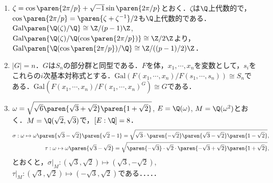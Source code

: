 \documentclass[a4paper,10pt]{ltjsarticle}
\newcommand{\gal}{\mathrm{Gal}}
\begin{document}
\begin{enumerate}
  \item \label{enshu:2.9} $\zeta = \cos\paren{2\pi/p} +\sqrt{-1}\sin\paren{2\pi/p}$とおく．$\zeta$は$\Q$上代数的で，$\cos\paren{2\pi/p} = \paren{\zeta + \zeta^{-1}}/2$も$\Q$上代数的である．$\gal\paren{\Q(\zeta)/\Q}\cong\Z/(p-1)\Z$, $\gal\paren{\Q(\zeta)/\Q(\cos\paren{2\pi/p})} \cong \Z/2\Z$より，$\gal\paren{\Q(\cos\paren{2\pi/p})/\Q} \cong \Z/((p-1)/2)\Z$．
  \item \label{enshu:2.10} $|G|=n$．$G$は$S_n$の部分群と同型である．$F$を体，$x_1, \cdots, x_n$を変数として，$s_i$をこれらの$i$次基本対称式とする．$\gal(F(x_1, \cdots, x_n)/F(s_1, \cdots, s_n))\cong S_n$である．$\gal(F(x_1, \cdots, x_n)/F(x_1, \cdots, x_n)^G)\cong G$である．
  \item \label{enshu:2.11} $\omega=\sqrt{\sqrt6\paren{\sqrt3+\sqrt2}\paren{{1+\sqrt2}}}$, $E=\Q(\omega)$, $M=\Q(\omega^2)$とおく．$M=\Q(\sqrt2, \sqrt3)$で，$[E:\Q]=8$．
  \begin{align*}
    \sigma : \omega\mapsto\omega\paren{\sqrt3-\sqrt2}\paren{\sqrt2-1}=\sqrt{\sqrt3\cdot\paren{-\sqrt2}\paren{\sqrt3-\sqrt2}\paren{1-\sqrt2}}, \\
    \tau : \omega\mapsto\omega\paren{\sqrt3-\sqrt2}=\sqrt{\paren{-\sqrt3}\cdot\sqrt{2}\cdot\paren{-\sqrt3+\sqrt2}\paren{1+\sqrt2}},
  \end{align*}
  とおくと，$\sigma|_M:(\sqrt3, \sqrt2)\mapsto(\sqrt3, -\sqrt2)$, $\tau|_M: (\sqrt3, \sqrt2)\mapsto(-\sqrt3, \sqrt2)$である．．．．．
\end{enumerate}
\end{document}
